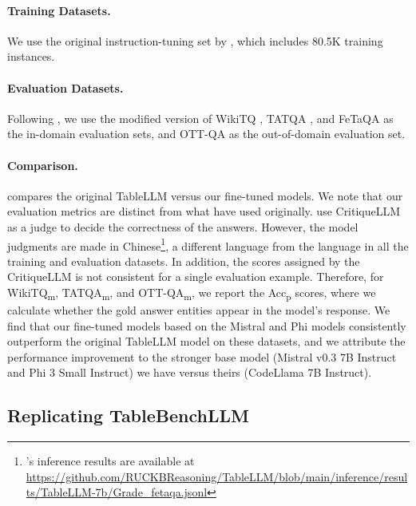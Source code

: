 \documentclass[11pt]{article}
\begin{document}
\paragraph{Training Datasets.} 
We use the original instruction-tuning set by \citet{zhang2024tablellm}, which includes 80.5K training instances.

\paragraph{Evaluation Datasets.}
Following \citet{zhang2024tablellm}, we use the modified version of WikiTQ \citep{pasupat-liang-2015-compositional}, TATQA \citep{zhu-etal-2021-tat}, and FeTaQA \citep{nan-etal-2022-fetaqa} as the in-domain evaluation sets, and OTT-QA \citep{chen2020open} as the out-of-domain evaluation set.

\paragraph{Comparison.}
 compares the original TableLLM versus our fine-tuned models.
We note that our evaluation metrics are distinct from what \citet{zhang2024tablellm} have used originally.
\citet{zhang2024tablellm} use CritiqueLLM \citep{ke-etal-2024-critiquellm} as a judge to decide the correctness of the answers.
However, the model judgments are made in Chinese\footnote{\citet{zhang2024tablellm}'s inference results are available at \url{https://github.com/RUCKBReasoning/TableLLM/blob/main/inference/results/TableLLM-7b/Grade\_fetaqa.jsonl}}, a different language from the language in all the training and evaluation datasets.
In addition, the scores assigned by the CritiqueLLM is not consistent for a single evaluation example.
Therefore, for WikiTQ\textsubscript{m}, TATQA\textsubscript{m}, and OTT-QA\textsubscript{m}, we report the Acc\textsubscript{p} scores, where we calculate whether the gold answer entities appear in the model's response.
We find that our fine-tuned models based on the Mistral and Phi models consistently outperform the original TableLLM model on these datasets, and we attribute the performance improvement to the stronger base model (Mistral v0.3 7B Instruct and Phi 3 Small Instruct) we have versus theirs (CodeLlama 7B Instruct).


\subsection{Replicating TableBenchLLM}
\end{document}
